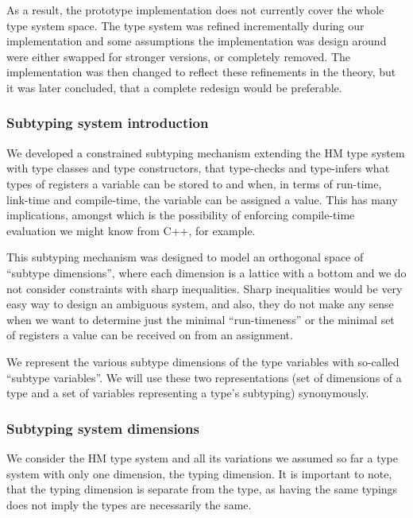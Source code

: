 As a result, the prototype implementation does not currently cover the whole type system space. The type system was refined incrementally during our implementation and some assumptions the implementation was design around were either swapped for stronger versions, or completely removed. The implementation was then changed to reflect these refinements in the theory, but it was later concluded, that a complete redesign would be preferable.

\subsubsection{Subtyping system introduction}

We developed a constrained subtyping mechanism extending the HM type system with type classes and type constructors, that type-checks and type-infers what types of registers a variable can be stored to and when, in terms of run-time, link-time and compile-time, the variable can be assigned a value. This has many implications, amongst which is the possibility of enforcing compile-time evaluation we might know from C++, for example.

This subtyping mechanism was designed to model an orthogonal space of ``subtype dimensions'', where each dimension is a lattice with a bottom and we do not consider constraints with sharp inequalities. Sharp inequalities would be very easy way to design an ambiguous system, and also, they do not make any sense when we want to determine just the minimal ``run-timeness'' or the minimal set of registers a value can be received on from an assignment.

We represent the various subtype dimensions of the type variables with so-called ``subtype variables''. We will use these two representations (set of dimensions of a type and a set of variables representing a type's subtyping) synonymously.

\subsubsection{Subtyping system dimensions}

\begin{remark}
    We consider the HM type system and all its variations we assumed so far a type system with only one dimension, the typing dimension. It is important to note, that the typing dimension is separate from the type, as having the same typings does not imply the types are necessarily the same.
\end{remark}

